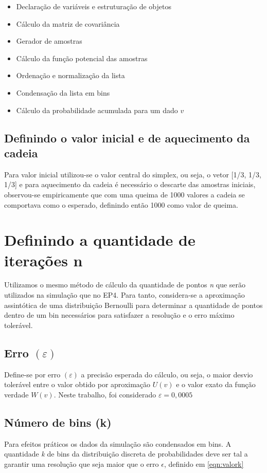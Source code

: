 \documentclass{article}
\begin{document}
\begin{itemize}
	\item Declaração de variáveis e estruturação de objetos
	\item Cálculo da matriz de covariância
	\item Gerador de amostras
	\item Cálculo da função potencial das amostras
	\item Ordenação e normalização da lista
	\item Condensação da lista em bins
	\item Cálculo da probabilidade acumulada para um dado $v$
\end{itemize}

\subsection{Definindo o valor inicial e de aquecimento da cadeia}

Para valor inicial utilizou-se o valor central do simplex, ou seja, o vetor [1/3, 1/3, 1/3] e para aquecimento da cadeia é necessário o descarte das amostras iniciais, observou-se empiricamente que com uma queima de 1000 valores a cadeia se comportava como o esperado, definindo então 1000 como valor de queima.

\section{Definindo a quantidade de iterações n}
\indent
Utilizamos o mesmo método de cálculo da quantidade de pontos \textit{n} que serão utilizados na simulação que no EP4. Para tanto, considera-se a aproximação assintótica de uma distribuição Bernoulli para determinar a quantidade de pontos dentro de um bin necessários para satisfazer a resolução e o erro máximo tolerável.

\subsection{Erro $(\varepsilon)$}
\indent
Define-se por erro $(\varepsilon)$ a precisão esperada do cálculo, ou seja, o maior desvio tolerável entre o valor obtido por aproximação $U(v)$ e o valor exato da função verdade $W(v)$. Neste trabalho, foi considerado $\varepsilon = 0,0005$

\subsection{Número de bins (k)}
\indent
Para efeitos práticos os dados da simulação são condensados em bins\cite{kaplan1987improved}. A quantidade \textit{k} de bins da distribuição discreta de probabilidades deve ser tal a garantir uma resolução que seja maior que o erro $\epsilon$, definido em \ref{eqn:valork}
\end{document}
